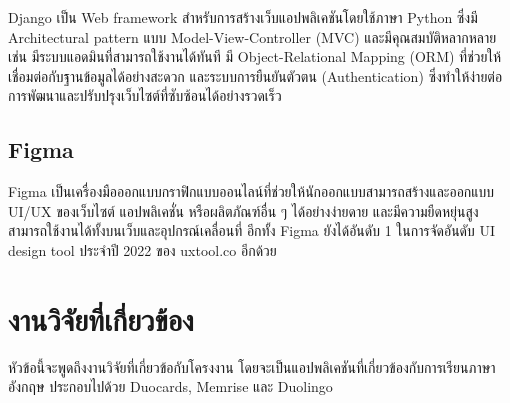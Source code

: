 \documentclass[12pt,oneside,openright,a4paper]{cpe-thai-project}
\begin{document}
\hspace{1cm}
Django เป็น Web framework สำหรับการสร้างเว็บแอปพลิเคชันโดยใช้ภาษา Python ซึ่งมี Architectural pattern
แบบ Model-View-Controller (MVC) และมีคุณสมบัติหลากหลาย เช่น มีระบบแอดมินที่สามารถใช้งานได้ทันที
มี Object-Relational Mapping (ORM) ที่ช่วยให้เชื่อมต่อกับฐานข้อมูลได้อย่างสะดวก และระบบการยืนยันตัวตน (Authentication)
ซึ่งทำให้ง่ายต่อการพัฒนาและปรับปรุงเว็บไซต์ที่ซับซ้อนได้อย่างรวดเร็ว

\subsection{Figma \cite{Figma}}

\hspace{1cm}
Figma เป็นเครื่องมือออกแบบกราฟิกแบบออนไลน์ที่ช่วยให้นักออกแบบสามารถสร้างและออกแบบ UI/UX ของเว็บไซต์
แอปพลิเคชั่น หรือผลิตภัณฑ์อื่น ๆ ได้อย่างง่ายดาย และมีความยืดหยุ่นสูง สามารถใช้งานได้ทั้งบนเว็บและอุปกรณ์เคลื่อนที่
อีกทั้ง Figma ยังได้อันดับ 1 ในการจัดอันดับ UI design tool ประจำปี 2022 ของ uxtool.co อีกด้วย

\pagebreak
\section{งานวิจัยที่เกี่ยวข้อง}

\hspace{1cm}
หัวข้อนี้จะพูดถึงงานวิจัยที่เกี่ยวข้อกับโครงงาน โดยจะเป็นแอปพลิเคชันที่เกี่ยวข้องกับการเรียนภาษาอังกฤษ
ประกอบไปด้วย Duocards, Memrise และ Duolingo
\end{document}
